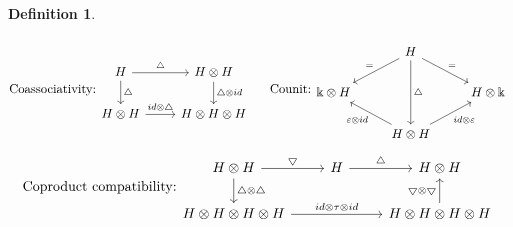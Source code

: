 \documentclass[12pt,a4paper]{article}
\newtheorem{definition}[theorem]{Definition}
\newcommand{\kk}{\Bbbk}
\newcommand\1{_{(1)}}
\newcommand\2{_{(2)}}
\begin{document}
\begin{definition}
\[\begin{tikzcd}
\end{tikzcd}
\]
\[
\text{Coassociativity:} %
\begin{tikzcd}
H \arrow[r, "\triangle"] \arrow[d, "\triangle"] & H\otimes H \arrow[d, "\triangle\otimes id"] \\
H\otimes H \arrow[r, "id\otimes\triangle"]               & H\otimes H\otimes H                        
\end{tikzcd}
\text{\;\;\;\; Counit:}
\begin{tikzcd}
             & H \arrow[ld, "="'] \arrow[rd, "="] \arrow[dd, "\triangle"]                         &             \\
\kk\otimes H &                                                                                    & H\otimes\kk \\
             & H\otimes H \arrow[lu, "\varepsilon\otimes id"] \arrow[ru, "id\otimes\varepsilon"'] &            
\end{tikzcd}
\]
\[
\text{Coproduct compatibility:}
\begin{tikzcd}
H\otimes H \arrow[d, "\triangle\otimes\triangle"] \arrow[r, "\bigtriangledown"] & H \arrow[r, "\triangle"] & H\otimes H                                                                  \\
H\otimes H\otimes H\otimes H \arrow[rr, "id\otimes\tau\otimes id"]           &                          & H\otimes H\otimes H\otimes H \arrow[u, "\bigtriangledown\otimes\bigtriangledown"]
\end{tikzcd}
\]
\[
\]
\end{definition}
\end{document}
